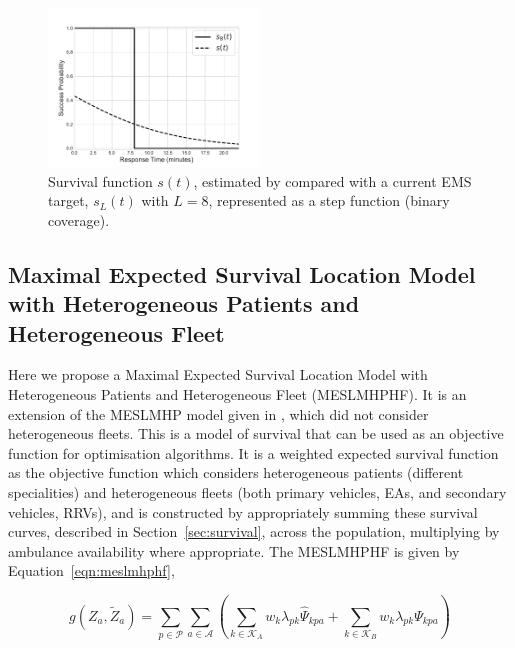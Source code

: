 \documentclass[preprint,12pt]{elsarticle}
\begin{document}
\begin{figure}[ht]
\centering
  \includegraphics[width=0.5\textwidth]{img/Survival_Function.pdf}
    \caption{Survival function $s(t)$, estimated by \cite{Valenzuela20001206}
             compared with a current EMS target, $s_L(t)$ with $L=8$,
             represented as a step function (binary coverage).}
  \label{fig:survivalfunction}
\end{figure}


\subsection{Maximal Expected Survival Location Model with Heterogeneous
            Patients and Heterogeneous Fleet}\label{sec:meslmhphf}
Here we propose a Maximal Expected Survival Location Model with Heterogeneous
Patients and Heterogeneous Fleet (MESLMHPHF). It is an extension of the
MESLMHP model given in \cite{Knight2012918}, which did not consider
heterogeneous fleets. This is a model of survival that can be used as an
objective function for optimisation algorithms. It is a weighted expected
survival function as the objective function which considers heterogeneous
patients (different specialities) and heterogeneous fleets (both primary
vehicles, EAs, and secondary vehicles, RRVs), and is constructed by
appropriately summing these survival curves, described in
Section~\ref{sec:survival}, across the population, multiplying by ambulance
availability where appropriate.
The MESLMHPHF is given by Equation~\ref{eqn:meslmhphf},

\begin{equation}\label{eqn:meslmhphf}
g\left(Z_a, \tilde{Z}_a\right) =
\sum_{p \in \mathcal{P}} \sum_{a \in \mathcal{A}}
\left( \sum_{k \in \mathcal{K}_A}  w_k \lambda_{pk} \hat{\Psi}_{kpa} +
\sum_{k \in \mathcal{K}_B}  w_k \lambda_{pk} \Psi_{kpa} \right)
\end{equation}
\end{document}
